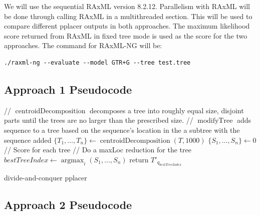 \documentclass[10pt]{article}
\begin{document}
We will use the sequential RAxML version 8.2.12. Parallelism with RAxML
will be done through calling RAxML in a multithreaded section. This will
be used to compare different pplacer outputs in both approaches. The
maximum likelihood score returned from RAxML in fixed tree mode is used
as the score for the two approaches. The command for RAxML-NG will be:

\begin{verbatim}
./raxml-ng --evaluate --model GTR+G --tree test.tree
\end{verbatim}

\subsection{Approach 1 Pseudocode}

\begin{algorithm}[H]
\SetAlgoLined
{}
 // $\operatorname{centroidDecomposition}$ decomposes a tree into roughly equal size, disjoint parts until the trees are no larger than the prescribed size.\;
 // $\operatorname{modifyTree}$ adds sequence to a tree based on the sequence's location in the a subtree with the sequence added\;
 $\{T_1,\dots,T_n\} \leftarrow \operatorname{centroidDecomposition}(T,1000)$\;
 $\{S_1, \dots, S_n\} \leftarrow 0$ // Score for each tree\;
 // Do a maxLoc reduction for the tree\;
 $bestTreeIndex \leftarrow \operatorname{argmax}_{i} (S_1,\dots,S_n)$\;
 return $T'_{q_{bestTreeIndex}}$\;
 \caption{divide-and-conquer pplacer}
 \label{alg:approach1}
\end{algorithm}

\subsection{Approach 2 Pseudocode}
\end{document}
